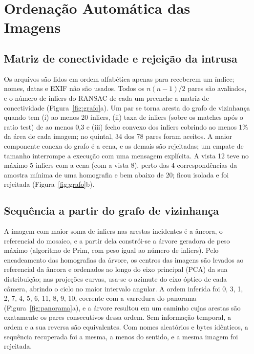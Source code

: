 \documentclass[10pt,a4paper]{article}
\begin{document}
\section{Ordenação Automática das Imagens}
\label{sec:ordem}
\subsection{Matriz de conectividade e rejeição da intrusa}
Os arquivos são lidos em ordem alfabética apenas para receberem um índice; nomes, datas e EXIF não são
usados. Todos os $n(n-1)/2$ pares são avaliados, e o número de inliers do RANSAC de cada um preenche a
matriz de conectividade (Figura~\ref{fig:grafo}a). Um par se torna aresta do grafo de vizinhança quando
tem (i) ao menos 20 inliers, (ii) taxa de inliers (sobre os matches após o ratio test) de ao menos 0,3 e
(iii) fecho convexo dos inliers cobrindo ao menos 1\% da área de cada imagem; no quintal, 34 dos 78 pares
foram aceitos. A maior componente conexa do grafo é a cena, e as demais são rejeitadas; um empate de
tamanho interrompe a execução com uma mensagem explícita. A vista 12 teve no máximo 5 inliers com a cena
(com a vista 8), perto das 4 correspondências da amostra mínima de uma homografia e bem abaixo de 20;
ficou isolada e foi rejeitada (Figura~\ref{fig:grafo}b).

\subsection{Sequência a partir do grafo de vizinhança}
A imagem com maior soma de inliers nas arestas incidentes é a âncora, o referencial do mosaico, e a partir
dela constrói-se a árvore geradora de peso máximo (algoritmo de Prim, com peso igual ao número de
inliers). Pelo encadeamento das homografias da árvore, os centros das imagens são levados ao referencial
da âncora e ordenados ao longo do eixo principal (PCA) da sua distribuição; nas projeções curvas, usa-se o
azimute do eixo óptico de cada câmera, abrindo o ciclo no maior intervalo angular. A ordem inferida foi 0,
3, 1, 2, 7, 4, 5, 6, 11, 8, 9, 10, coerente com a varredura do panorama (Figura~\ref{fig:panorama}a), e a
árvore resultou em um caminho cujas arestas são exatamente os pares consecutivos dessa ordem. Sem
informação temporal, a ordem e a sua reversa são equivalentes. Com nomes aleatórios e bytes idênticos, a
sequência recuperada foi a mesma, a menos do sentido, e a mesma imagem foi rejeitada.
\end{document}
